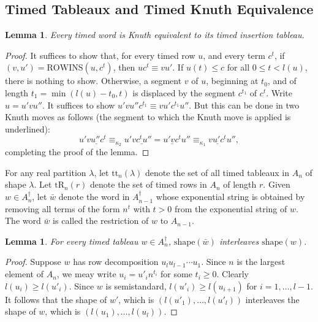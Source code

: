 \documentclass[12pt]{amsart}
\newtheorem{lemma}[theorem]{Lemma}
\theoremstyle{definition}
\newcommand{\rowins}{\mathrm{ROWINS}}
\newcommand{\shape}{\mathrm{shape}}
\newcommand{\ttab}{\mathrm{tt}}
\newcommand{\tr}{\mathrm{tR}}
\begin{document}
\subsection{Timed Tableaux and Timed Knuth Equivalence}
\label{sec:timed-tableaux-timed-equiv}
\begin{lemma}
  \label{lemma:insertion-and-equivalence}
  Every timed word is Knuth equivalent to its timed insertion tableau.
\end{lemma}
\begin{proof}
  It suffices to show that, for every timed row $u$, and every term $c^t$, if $(v,u')=\rowins(u,c^t)$, then $uc^t\equiv vu'$.
  If $u(t)\leq c$ for all $0\leq t<l(u)$, there is nothing to show.
  Otherwise, a segment $v$ of $u$, beginning at $t_0$, and of length $t_1=\min(l(u)-t_0,t)$ is displaced by the segment $c^{t_1}$ of $c^t$.
  Write $u=u'vu''$.
  It suffices to show $u'vu''c^{t_1}\equiv vu'c^{t_1}u''$.
  But this can be done in two Knuth moves as follows (the segment to which the Knuth move is applied is underlined):
  \begin{displaymath}
    u'\underline{v u'' c^t} \equiv_{\kappa_2} u'\underline{vc^tu''} = \underline{u'vc^t}u'' \equiv_{\kappa_1} \underline{vu'c^t}u'',
  \end{displaymath}
  completing the proof of the lemma.
\end{proof}
For any real partition $\lambda$, let $\ttab_n(\lambda)$ denote the set of all timed tableaux in $A_n$ of shape $\lambda$.
Let $\tr_n(r)$ denote the set of timed rows in $A_n$ of length $r$.
Given $w\in A_n^\dagger$, let $\bar w$ denote the word in $A_{n-1}^\dagger$ whose exponential string is obtained by removing all terms of the form $n^t$ with $t>0$ from the exponential string of $w$.
The word $\bar w$ is called the restriction of $w$ to $A_{n-1}$.
\begin{lemma}
  \label{lemma:restriction-interleaf}
  For every timed tableau $w\in A_n^\dagger$, $\shape(\bar w)$ interleaves $\shape(w)$.
\end{lemma}
\begin{proof}
  Suppose $w$ has row decomposition $u_lu_{l-1}\dotsb u_1$.
  Since $n$ is the largest element of $A_n$, we meay write $u_i=u'_in^{t_i}$ for some $t_i\geq 0$.
  Clearly $l(u_i)\geq l(u'_i)$.
  Since $w$ is semistandard, $l(u'_i)\geq l(u_{i+1})$ for $i=1,\dotsc,l-1$. 
  It follows that the shape of $w'$, which is $(l(u'_1),\dotsc,l(u'_l))$ interleaves the shape of $w$, which is $(l(u_1),\dotsc,l(u_l))$.
\end{proof}
\end{document}
